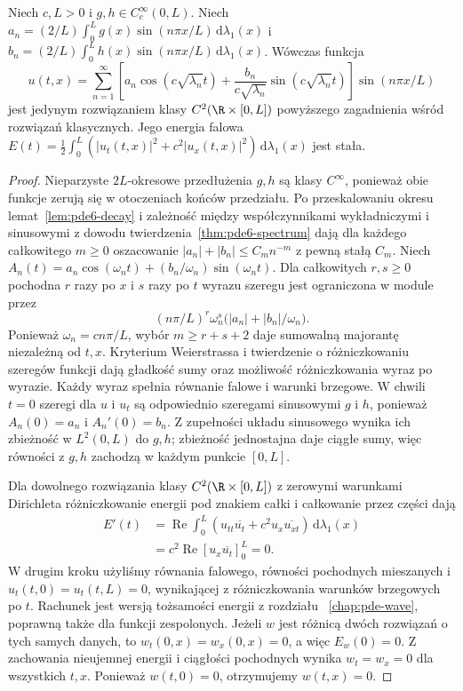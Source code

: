 \begin{twierdzenie}
\label{thm:pde6-wave}
Niech $c,L>0$ i $g,h\in C_c^\infty(0,L)$.
Niech $a_n=(2/L)\int_0^Lg(x)\sin(n\pi x/L)
\,\mathrm d\lambda_1(x)$ i
$b_n=(2/L)\int_0^Lh(x)\sin(n\pi x/L)\,\mathrm d\lambda_1(x)$.
Wówczas funkcja
\begin{equation}\label{eq:pde6-wave}
 u(t,x)=\sum_{n=1}^\infty
 \left[a_n\cos(c\sqrt{\lambda_n}t)
 +\frac{b_n}{c\sqrt{\lambda_n}}
 \sin(c\sqrt{\lambda_n}t)\right]\sin(n\pi x/L)
\end{equation}
jest jedynym rozwiązaniem klasy $C^2(\R\times[0,L])$
powyższego zagadnienia wśród rozwiązań klasycznych.
Jego energia falowa
$E(t)=\frac12\int_0^L(|u_t(t,x)|^2+c^2|u_x(t,x)|^2)
\,\mathrm d\lambda_1(x)$ jest stała.
\end{twierdzenie}
\begin{proof}
Nieparzyste $2L$-okresowe przedłużenia $g,h$
są klasy $C^\infty$, ponieważ obie funkcje
zerują się w otoczeniach końców przedziału.
Po przeskalowaniu okresu lemat~\ref{lem:pde6-decay}
i zależność między współczynnikami wykładniczymi
i sinusowymi z dowodu twierdzenia~\ref{thm:pde6-spectrum}
dają dla każdego całkowitego $m\ge0$ oszacowanie
$|a_n|+|b_n|\le C_m n^{-m}$ z pewną stałą $C_m$.
Niech $A_n(t)=a_n\cos(\omega_nt)
+(b_n/\omega_n)\sin(\omega_nt)$.
Dla całkowitych $r,s\ge0$ pochodna $r$ razy po $x$
i $s$ razy po $t$ wyrazu szeregu jest ograniczona
w module przez
\[
 (n\pi/L)^r\omega_n^s
 \bigl(|a_n|+|b_n|/\omega_n\bigr).
\]
Ponieważ $\omega_n=cn\pi/L$, wybór $m\ge r+s+2$
daje sumowalną majorantę niezależną od $t,x$.
Kryterium Weierstrassa i twierdzenie o różniczkowaniu
szeregów funkcji dają gładkość sumy oraz możliwość
różniczkowania wyraz po wyrazie. Każdy wyraz spełnia
równanie falowe i warunki brzegowe. W chwili $t=0$
szeregi dla $u$ i $u_t$ są odpowiednio szeregami
sinusowymi $g$ i $h$, ponieważ $A_n(0)=a_n$
i $A_n'(0)=b_n$. Z zupełności układu sinusowego
wynika ich zbieżność w $L^2(0,L)$ do $g,h$;
zbieżność jednostajna daje ciągłe sumy, więc równości
z $g,h$ zachodzą w każdym punkcie $[0,L]$.

Dla dowolnego rozwiązania klasy $C^2(\R\times[0,L])$
z zerowymi warunkami Dirichleta różniczkowanie energii
pod znakiem całki i całkowanie przez części dają
\[
 \begin{aligned}
 E'(t)
 &=\operatorname{Re}\int_0^L
 (u_{tt}\overline{u_t}+c^2u_x\overline{u_{xt}})
 \,\mathrm d\lambda_1(x)\\
 &=c^2\operatorname{Re}[u_x\overline{u_t}]_0^L=0.
 \end{aligned}
\]
W drugim kroku użyliśmy równania falowego,
równości pochodnych mieszanych i $u_t(t,0)=u_t(t,L)=0$,
wynikającej z różniczkowania warunków brzegowych po $t$.
Rachunek jest wersją tożsamości energii z rozdziału
~\ref{chap:pde-wave}, poprawną także dla funkcji zespolonych.
Jeżeli $w$ jest różnicą dwóch rozwiązań o tych samych danych,
to $w_t(0,x)=w_x(0,x)=0$, a więc $E_w(0)=0$.
Z zachowania nieujemnej energii i ciągłości pochodnych
wynika $w_t=w_x=0$ dla wszystkich $t,x$. Ponieważ
$w(t,0)=0$, otrzymujemy $w(t,x)=0$.


\end{proof}
